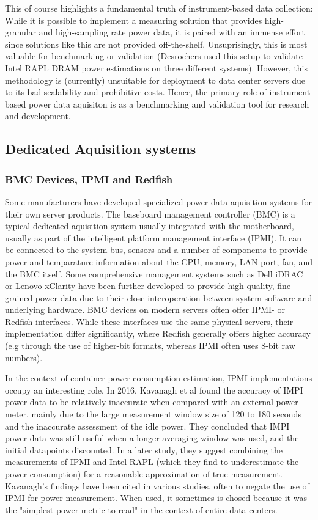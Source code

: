 This of course highlights a fundamental truth of instrument-based data collection: While it is possible to implement a measuring solution that provides high-granular and high-sampling rate power data, it is paired with an immense effort since solutions like this are not provided off-the-shelf. Unsuprisingly, this is most valuable for benchmarking or validation (Desrochers used this setup to validate Intel RAPL DRAM power estimations on three different systems). However, this methodology is (currently) unsuitable for deployment to data center servers due to its bad scalability and prohibitive costs. Hence, the primary role of instrument-based power data aquisiton is as a benchmarking and validation tool for research and development.

\subsection{Dedicated Aquisition systems}
\subsubsection{BMC Devices, IPMI and Redfish}
Some manufacturers have developed specialized power data aquisition systems for their own server products. The baseboard management controller (BMC) is a typical dedicated aquisition system usually integrated with the motherboard, usually as part of the intelligent platform management interface (IPMI)\parencite{lin2020taxonomy}. It can be connected to the system bus, sensors and a number of components to provide power and temparature information about the CPU, memory, LAN port, fan, and the BMC itself. Some comprehensive management systems such as Dell iDRAC or Lenovo xClarity have been further developed to provide high-quality, fine-grained power data due to their close interoperation between system software and underlying hardware. BMC devices on modern servers often offer IPMI- or Redfish interfaces. While these interfaces use the same physical servers, their implementation differ significantly, where Redfish generally offers higher accuracy (e.g through the use of higher-bit formats, whereas IPMI often uses 8-bit raw numbers).

In the context of container power consumption estimation, IPMI-implementations occupy an interesting role. In 2016, Kavanagh et al\parencite{kavanagh2016accuracy} found the accuracy of IMPI power data to be relatively inaccurate when compared with an external power meter, mainly due to the large measurement window size of 120 to 180 seconds and the inaccurate assessment of the idle power. They concluded that IMPI power data was still useful when a longer averaging window was used, and the initial datapoints discounted. In a later study, they suggest combining the measurements of IPMI and Intel RAPL (which they find to underestimate the power consumption) for a reasonable approximation of true measurement\parencite{kavanagh2019rapid}. Kavanagh's findings have been cited in various studies, often to negate the use of IPMI for power measurement. When used, it sometimes is chosed because it was the "simplest power metric to read"\parencite{white2020monitoring} in the context of entire data centers.

